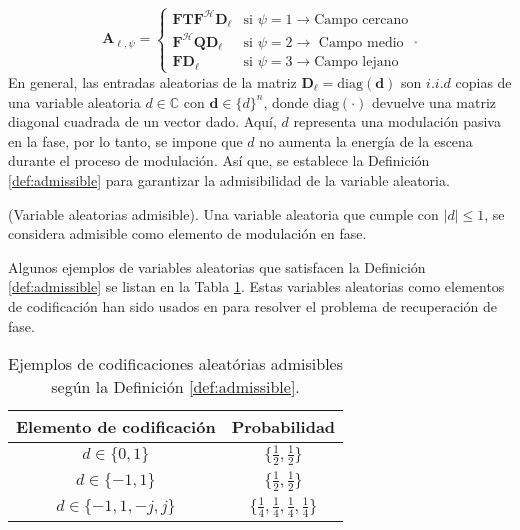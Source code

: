 \begin{equation}
    \mathbf{A}_{\ell,\psi}= \left\{\begin{matrix}
\mathbf{F}\mathbf{T}\mathbf{F}^\mathcal{H} \mathbf{D}_\ell  & \text{si } \psi=1\rightarrow \text{Campo cercano}\\ 
\mathbf{F}^\mathcal{H}\mathbf{Q}\mathbf{D}_\ell &\text{si } \psi=2\rightarrow\text{ Campo medio} \\ 
\mathbf{F}\mathbf{D}_\ell  &\text{si } \psi=3\rightarrow\text{Campo lejano}
\end{matrix}\right.. \label{eq:matrix_a}
\end{equation}
En general, las entradas aleatorias de la matriz  $\mathbf{D}_{\ell} = \mathrm{diag}(\mathbf{d})$ son $i.i.d$ copias de una variable aleatoria $d \in \mathbb{C}$ con $\mathbf{d} \in \{d\}^{n}$, donde $\mathrm{diag}(\cdot)$ devuelve una matriz diagonal cuadrada de un vector dado. Aquí, $d$ representa una modulación pasiva en la fase, por lo tanto, se impone que $d$ no aumenta la energía de la escena durante el proceso de modulación. Así que, se establece la Definición \ref{def:admissible} para garantizar la admisibilidad de la variable aleatoria.

\begin{definition}{(Variable aleatorias admisible). } 
    Una variable aleatoria que cumple con $|d|\leq 1$, se considera admisible como elemento de modulación en fase.\label{def:admissible}
\end{definition}


Algunos ejemplos de variables aleatorias que satisfacen la Definición \ref{def:admissible} se listan en la Tabla \ref{tab:admi_examples}. Estas variables aleatorias como elementos de codificación han sido usados en  para resolver el problema de recuperación de fase.

\begin{table}[!h]
\centering
\caption{Ejemplos de codificaciones aleatórias admisibles según la Definición \ref{def:admissible}.}
\begin{tabular}{|c|c|}
\hline
\textbf{Elemento de codificación} & \textbf{Probabilidad}                     \\ \hline
$d \in \{0, 1\}$         & $\{ \frac{1}{2},  \frac{1}{2}\}$ \\ \hline
$d \in \{-1, 1\}$        & $\{ \frac{1}{2},  \frac{1}{2}\}$ \\ \hline
$d \in \{-1, 1, -j,  j\}$ & $\{ \frac{1}{4},  \frac{1}{4}, \frac{1}{4},  \frac{1}{4}\}$ \\ \hline
\end{tabular}
\label{tab:admi_examples}
\end{table}

